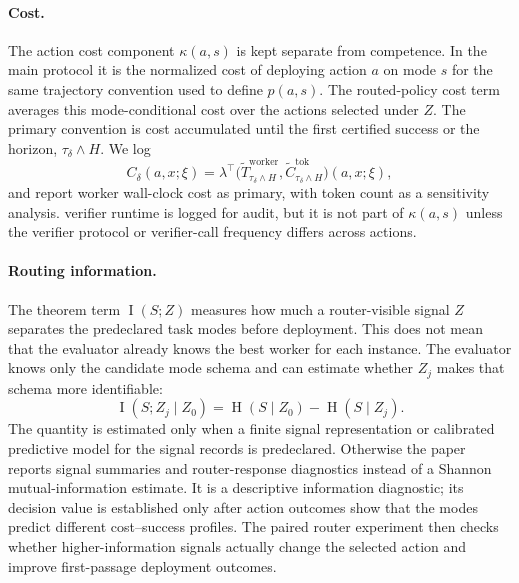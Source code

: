 \documentclass{article}
\DeclareMathOperator{\MI}{I}
\DeclareMathOperator{\Hent}{H}
\begin{document}
\paragraph{Cost.}
The action cost component $\kappa(a,s)$ is kept separate from competence.
In the main protocol it is the normalized cost of deploying action $a$ on mode $s$ for the same trajectory convention used to define $p(a,s)$.
The routed-policy cost term averages this mode-conditional cost over the actions selected under $Z$.
The primary convention is cost accumulated until the first certified success or the horizon, $\tau_\delta\wedge H$.
We log
\[
C_\delta(a,x;\xi)
=
\lambda^\top
\bigl(
\widetilde T^{\mathrm{worker}}_{\tau_\delta\wedge H},
\widetilde C^{\mathrm{tok}}_{\tau_\delta\wedge H}
\bigr)(a,x;\xi),
\]
and report worker wall-clock cost as primary, with token count as a sensitivity analysis.
verifier runtime is logged for audit, but it is not part of $\kappa(a,s)$ unless the verifier protocol or verifier-call frequency differs across actions.

\paragraph{Routing information.}
The theorem term $\MI(S;Z)$ measures how much a router-visible signal $Z$ separates the predeclared task modes before deployment.
This does not mean that the evaluator already knows the best worker for each instance.
The evaluator knows only the candidate mode schema and can estimate whether $Z_j$ makes that schema more identifiable:
\[
\MI(S;Z_j\mid Z_0)=\Hent(S\mid Z_0)-\Hent(S\mid Z_j).
\]
The quantity is estimated only when a finite signal representation or calibrated predictive model for the signal records is predeclared.
Otherwise the paper reports signal summaries and router-response diagnostics instead of a Shannon mutual-information estimate.
It is a descriptive information diagnostic; its decision value is established only after action outcomes show that the modes predict different cost--success profiles.
The paired router experiment then checks whether higher-information signals actually change the selected action and improve first-passage deployment outcomes.
\end{document}
